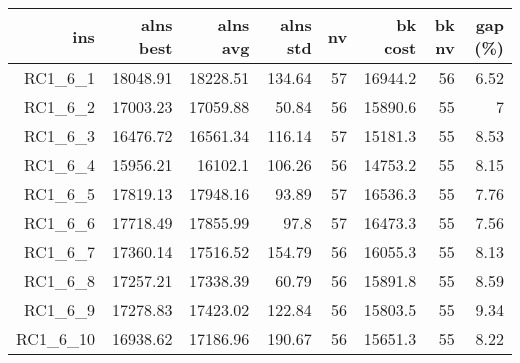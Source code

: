   \begin{table}[caption={Kết quả đo với tập HG\_RC\_1\_6 600 yêu cầu}, label=exp:HGRC16]
    \centering
    \begin{tabular}{rrrrrrrr}
    \hline
    ins & alns best & alns avg & alns std & nv & bk cost & bk nv & gap (\%) \\ \hline
    RC1\_6\_1 & 18048.91 & 18228.51 & 134.64 & 57 & 16944.2 & 56 & 6.52 \\ \hline
    RC1\_6\_2 & 17003.23 & 17059.88 & 50.84 & 56 & 15890.6 & 55 & 7 \\ \hline
    RC1\_6\_3 & 16476.72 & 16561.34 & 116.14 & 57 & 15181.3 & 55 & 8.53 \\ \hline
    RC1\_6\_4 & 15956.21 & 16102.1 & 106.26 & 56 & 14753.2 & 55 & 8.15 \\ \hline
    RC1\_6\_5 & 17819.13 & 17948.16 & 93.89 & 57 & 16536.3 & 55 & 7.76 \\ \hline
    RC1\_6\_6 & 17718.49 & 17855.99 & 97.8 & 57 & 16473.3 & 55 & 7.56 \\ \hline
    RC1\_6\_7 & 17360.14 & 17516.52 & 154.79 & 56 & 16055.3 & 55 & 8.13 \\ \hline
    RC1\_6\_8 & 17257.21 & 17338.39 & 60.79 & 56 & 15891.8 & 55 & 8.59 \\ \hline
    RC1\_6\_9 & 17278.83 & 17423.02 & 122.84 & 56 & 15803.5 & 55 & 9.34 \\ \hline
    RC1\_6\_10 & 16938.62 & 17186.96 & 190.67 & 56 & 15651.3 & 55 & 8.22 \\ \hline
    \end{tabular}
  \end{table}

